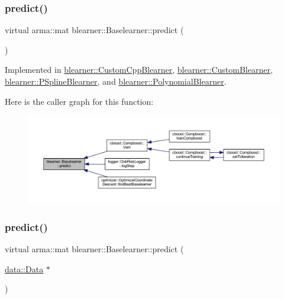 \subsubsection{\texorpdfstring{predict()}{predict()}\hspace{0.1cm}{\footnotesize\ttfamily [1/2]}}
{\footnotesize\ttfamily virtual arma\+::mat blearner\+::\+Baselearner\+::predict (\begin{DoxyParamCaption}{ }\end{DoxyParamCaption})\hspace{0.3cm}{\ttfamily [pure virtual]}}



Implemented in \mbox{\hyperlink{classblearner_1_1_custom_cpp_blearner_aa17db5f5627b8251b2d8484d92e783b9}{blearner\+::\+Custom\+Cpp\+Blearner}}, \mbox{\hyperlink{classblearner_1_1_custom_blearner_a20b5fe06512aa73478b9f934e1c81c31}{blearner\+::\+Custom\+Blearner}}, \mbox{\hyperlink{classblearner_1_1_p_spline_blearner_aa46e4474a352876fbfad64921254f6d5}{blearner\+::\+P\+Spline\+Blearner}}, and \mbox{\hyperlink{classblearner_1_1_polynomial_blearner_a422569884414d31db5a2b770b22176c3}{blearner\+::\+Polynomial\+Blearner}}.

Here is the caller graph for this function\+:
\nopagebreak
\begin{figure}[H]
\begin{center}
\leavevmode
\includegraphics[width=350pt]{classblearner_1_1_baselearner_ab37986047db43c84420fef2cef7fc20d_icgraph}
\end{center}
\end{figure}
\mbox{\label{classblearner_1_1_baselearner_ae2ef5e018783578e02b3b5a33fa94eae}} 
\subsubsection{\texorpdfstring{predict()}{predict()}\hspace{0.1cm}{\footnotesize\ttfamily [2/2]}}
{\footnotesize\ttfamily virtual arma\+::mat blearner\+::\+Baselearner\+::predict (\begin{DoxyParamCaption}\item[{\mbox{\hyperlink{classdata_1_1_data}{data\+::\+Data}} $\ast$}]{ }\end{DoxyParamCaption})\hspace{0.3cm}{\ttfamily [pure virtual]}}




